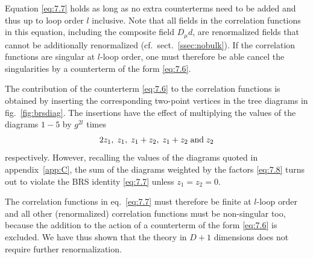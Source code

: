 Equation \eqref{eq:7.7} holds as long as no extra counterterms need to be
added and thus up to loop order $l$ inclusive. Note that
all fields in the correlation functions in this
equation, including the composite field $D_{\mu}d$,
are renormalized fields that cannot be additionally
renormalized (cf.~sect.~\ref{ssec:nobulk}).
If the correlation functions
are singular at $l$-loop order, one must therefore
be able cancel the singularities by a counterterm of
the form \eqref{eq:7.6}.

The contribution of the counterterm \eqref{eq:7.6} to the correlation
functions is obtained by inserting the corresponding two-point
vertices in the tree diagrams in fig.~\ref{fig:brsdiag}. The insertions have
the effect of multiplying the values of the diagrams $1-5$ by
$g^{2l}$ times
\begin{equation}
   2z_1,\;z_1,\;z_1+z_2,\;z_1+z_2\;\hbox{and}\;z_2
   \label{eq:7.8}
\end{equation}
respectively. However,
recalling the values of the diagrams
quoted in appendix~\ref{app:C}, the sum of the diagrams
weighted by the factors \eqref{eq:7.8} turns out to violate
the BRS identity \eqref{eq:7.7} unless $z_1=z_2=0$.

The correlation functions in eq.~\eqref{eq:7.7} must therefore be finite
at $l$-loop order and all other (renormalized) correlation functions
must be non-singular too, because the addition to the action
of a counterterm of the form \eqref{eq:7.6} is excluded.
We have thus shown that the theory in $D+1$
dimensions does not require further renormalization.
